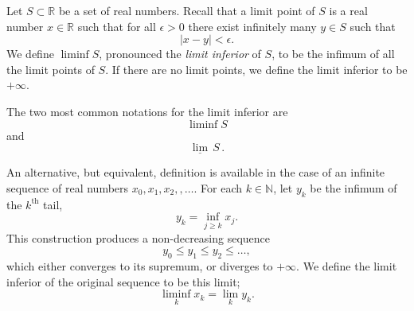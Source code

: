 \documentclass{article}
\newcommand{\reals}{\mathbb{R}}
\newcommand{\natnums}{\mathbb{N}}
\newcommand{\supth}{^{\text{th}}}
\begin{document}
Let $S\subset\reals$ be a set of real numbers.  Recall that a limit
point of $S$ is a real number $x\in\reals$ such that for all
$\epsilon>0$ there exist infinitely many $y\in S$ such that
$$\vert x-y\vert <\epsilon.$$
We define $\liminf S$, pronounced the
{\em limit inferior} of $S$, to be the infimum of all the limit
points of $S$.  If there are no limit points, we define the limit
inferior to be $+\infty$.

The two most common notations for the limit inferior are 
$$\liminf S$$ and
$$\underline{\lim}\, S\,.$$

An alternative, but equivalent, definition is available in the case of
an infinite sequence of real numbers $x_0, x_1, x_2, ,\ldots$.  For
each $k\in\natnums$, let $y_k$ be the infimum of the $k\supth$ tail,
$$y_k = \inf_{j\geq k} x_j .$$
This construction produces a
non-decreasing sequence
$$y_0 \leq y_1 \leq y_2 \leq \ldots,$$
which either converges to its supremum, or diverges to $+\infty$.
We define the limit inferior of the original sequence to be this limit;
$$\liminf_{k} x_k = \lim_k y_k.$$
\end{document}
